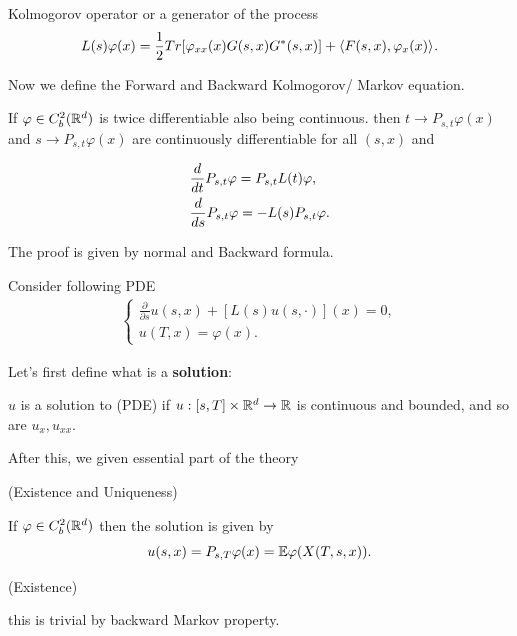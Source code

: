 Kolmogorov operator or a generator of the process
\begin{equation*}
    L(s)\varphi(x) = \frac{1}{2} Tr[\varphi_{xx}(x) G(s,x) G^*(s,x)] + \langle{F(s,x), \varphi_x(x)} \rangle_{}.
\end{equation*}

Now we define the Forward and Backward Kolmogorov/ Markov equation.

\begin{thm}
If $\varphi\in C_b^2(\mathbb{R}^d)$ is twice differentiable also being continuous. then $t\to P_{s,t}\varphi(x)$ and $s\to P_{s,t}\varphi(x)$ are continuously differentiable for all $(s,x)$ and

\begin{align*}
    &\frac{\mathop{}\!d}{\mathop{}\!d t} P_{s,t} \varphi = P_{s,t}L(t)\varphi, \\
    &\frac{\mathop{}\!d}{\mathop{}\!d s} P_{s,t} \varphi = -L(s)P_{s,t}\varphi.
\end{align*}
\end{thm}

\pf The proof is given by normal \ito and Backward \ito formula.

Consider following PDE
\begin{align*}
    \begin{cases}
    \frac{\partial }{\partial s} u(s,x) + [L(s) u(s, \cdot)](x) = 0, \\
    u(T,x) = \varphi(x).
    \end{cases}
\end{align*}

Let's first define what is a \textbf{solution}:

\begin{dfn}
$u$ is a solution to (PDE) if $u:[s,T]\times \mathbb{R}^d \rightarrow \mathbb{R}$ is continuous and bounded, and so are $u_x, u_{xx}$.
\end{dfn}

After this, we given essential part of the theory

\begin{thm}{(Existence and Uniqueness)}

If $\varphi\in C_b^2(\mathbb{R}^d)$ then the solution is given by
\begin{equation*}
    u(s,x) = P_{s,T}\varphi(x) = \mathbb{E}\varphi(X(T,s,x)).
\end{equation*}
\end{thm}

\pf
(Existence) 

this is trivial by backward Markov property.

